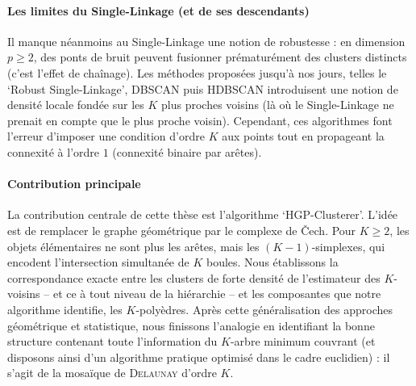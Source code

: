 \begin{AbstractPage}
\begin{resume}
\paragraph{Les limites du Single-Linkage (et de ses descendants)}
Il manque néanmoins au Single-Linkage une notion de robustesse : en dimension \(p\geq2\),  des ponts de bruit peuvent fusionner prématurément des clusters distincts (c'est l'effet de chaînage). Les méthodes proposées jusqu'à nos jours, telles le `Robust Single-Linkage', DBSCAN puis HDBSCAN introduisent une notion de densité locale fondée sur les \(K\) plus proches voisins (là où le Single-Linkage ne prenait en compte que le plus proche voisin).
Cependant, ces algorithmes font l'erreur d'imposer une condition d'ordre \(K\) aux points tout en propageant la connexité à l'ordre \(1\) (connexité binaire par arêtes). %

\paragraph{Contribution principale}
La contribution centrale de cette thèse est l'algorithme `HGP-Clusterer'. L'idée est de remplacer le graphe géométrique par le complexe de \v{C}ech. Pour \(K\geq2\), les objets élémentaires ne sont plus les arêtes, mais les \((K-1)\)-simplexes, qui encodent l'intersection simultanée de \(K\) boules. %
Nous établissons la correspondance exacte entre les clusters de forte densité de l'estimateur des $K$-voisins -- et ce à tout niveau de la hiérarchie -- et les composantes que notre algorithme identifie, les \(K\)-polyèdres. 
Après cette généralisation des approches géométrique et statistique, nous finissons l'analogie en identifiant la bonne structure contenant toute l'information du $K$-arbre minimum couvrant (et disposons ainsi d'un algorithme pratique optimisé dans le cadre euclidien) : il s'agit de la mosaïque de \textsc{Delaunay} d'ordre $K$.




\end{resume}
\end{AbstractPage}
